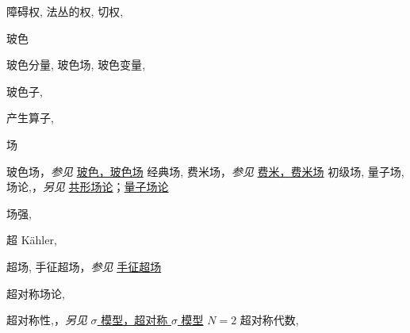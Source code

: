 \begin{theindex}
\subitem \leavevmode\hypertarget{idx:1435}{障碍权},\enspace{}
\subitem \leavevmode\hypertarget{idx:1436}{法丛的权},\enspace{}
\subitem \leavevmode\hypertarget{idx:1437}{切权},\enspace{}
\indexspace
\item \leavevmode\hypertarget{idx:0081}{玻色}
\subitem \leavevmode\hypertarget{idx:0082}{玻色分量},\enspace{}
\subitem \leavevmode\hypertarget{idx:0083}{玻色场},\enspace{}
\subitem \leavevmode\hypertarget{idx:0084}{玻色变量},\enspace{}
\indexspace
\item \leavevmode\hypertarget{idx:0080}{玻色子},\enspace{}
\indexspace
\item \leavevmode\hypertarget{idx:0203}{产生算子},\enspace{}
\indexspace
\item \leavevmode\hypertarget{idx:0316}{场}
\subitem \leavevmode\hypertarget{idx:0317}{玻色场}，\textit{参见} \hyperlink{idx:0083}{玻色，玻色场}
\subitem \leavevmode\hypertarget{idx:0318}{经典场},\enspace{}
\subitem \leavevmode\hypertarget{idx:0319}{费米场}，\textit{参见} \hyperlink{idx:0312}{费米，费米场}
\subitem \leavevmode\hypertarget{idx:0320}{初级场},\enspace{}
\subitem \leavevmode\hypertarget{idx:0321}{量子场},\enspace{}
\subitem \leavevmode\hypertarget{idx:0322}{场论},\enspace{}，\textit{另见} \hyperlink{idx:0162}{共形场论}；\hyperlink{idx:1155}{量子场论}
\indexspace
\item \leavevmode\hypertarget{idx:0323}{场强},\enspace{}
\indexspace
\item \leavevmode\hypertarget{idx:0620}{超 Kähler},\enspace{}
\indexspace
\item \leavevmode\hypertarget{idx:1296}{超场},\enspace{}
\subitem \leavevmode\hypertarget{idx:1297}{手征超场}，\textit{参见} \hyperlink{idx:0121}{手征超场}
\indexspace
\item \leavevmode\hypertarget{idx:1309}{超对称场论},\enspace{}
\indexspace
\item \leavevmode\hypertarget{idx:1310}{超对称性},\enspace{}，\textit{另见} \hyperlink{idx:1254}{$\sigma$ 模型，超对称 $\sigma$ 模型}
\subitem \leavevmode\hypertarget{idx:1311}{$N=2$ 超对称代数},\enspace{}

\end{theindex}
